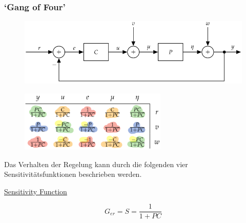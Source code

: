 \documentclass[
  10pt,
  a4paper,
  twocolumn]{article}
\numberwithin{equation}{section}
\begin{document}
\hypertarget{gang-of-four}{%
\subsubsection{`Gang of Four'}\label{gang-of-four}}

\begin{figure}[H]

{\centering \includegraphics{images/paste-44.png}

}

\end{figure}

\begin{figure}[H]

{\centering \includegraphics[width=7cm,height=\textheight]{images/paste-43.png}

}

\end{figure}

Das Verhalten der Regelung kann durch die folgenden vier
Sensitivitätsfunktionen beschrieben werden.

\underline{\footnotesize{Sensitivity Function}}

\[
G_{er} = S = \frac1{1+PC} 
\]
\end{document}
